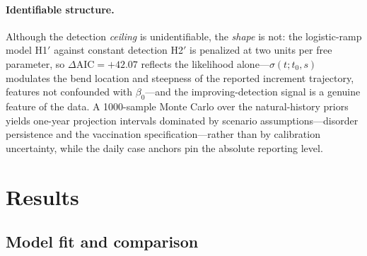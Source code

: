 \documentclass[10pt]{plos}
\begin{document}
\paragraph{Identifiable structure.}
Although the detection \emph{ceiling} is unidentifiable, the \emph{shape}
is not: the logistic-ramp model H1$'$ against constant detection H2$'$
is penalized at two units per free parameter, so
$\Delta\mathrm{AIC}=+42.07$ reflects the likelihood
alone---$\sigma(t;t_0,s)$ modulates the bend location and steepness of
the reported increment trajectory, features not confounded with
$\beta_0$---and the improving-detection signal is a genuine feature of
the data. A 1000-sample Monte Carlo over the natural-history priors
yields one-year projection intervals dominated by scenario
assumptions---disorder persistence and the vaccination
specification---rather than by calibration uncertainty, while the daily
case anchors pin the absolute reporting level.
\section{Results}\label{sec:results}

\subsection{Model fit and comparison}
\end{document}
